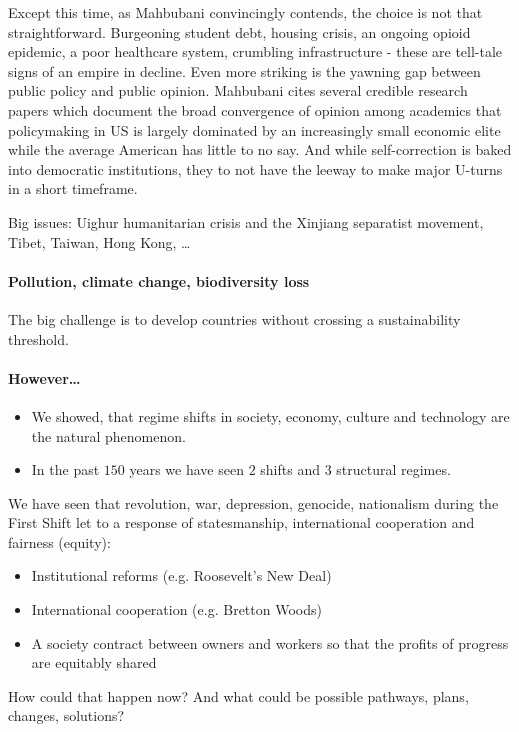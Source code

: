 \vspace{1\baselineskip}

Except this time, as Mahbubani convincingly contends, the choice is not that
straightforward. Burgeoning student debt, housing crisis, an ongoing opioid
epidemic, a poor healthcare system, crumbling infrastructure - these are
tell-tale signs of an empire in decline. Even more striking is the yawning
gap between public policy and public opinion. Mahbubani cites several
credible research papers which document the broad convergence of opinion
among academics that policymaking in US is largely dominated by an increasingly
small economic elite while the average American has little to no say. And
while self-correction is baked into democratic institutions, they to not have
the leeway to make major U-turns in a short timeframe.

\vspace{1\baselineskip}

Big issues: Uighur humanitarian crisis and the Xinjiang separatist movement,
Tibet, Taiwan, Hong Kong, \dots

\paragraph{Pollution, climate change, biodiversity loss}

The big challenge is to develop countries without crossing a sustainability
threshold.

\paragraph{However\dots}

\begin{itemize}
    \item We showed, that regime shifts in society, economy, culture and
        technology are the natural phenomenon.
    \item In the past $150$ years we have seen $2$ shifts and $3$ structural
        regimes.
\end{itemize}

We have seen that revolution, war, depression, genocide, nationalism during
the First Shift let to a response of statesmanship, international cooperation
and fairness (equity):
\begin{itemize}
    \item Institutional reforms (e.g. Roosevelt's New Deal)
    \item International cooperation (e.g. Bretton Woods)
    \item A society contract between owners and workers so that the profits
        of progress are equitably shared
\end{itemize}
How could that happen now? And what could be possible pathways, plans,
changes, solutions?

